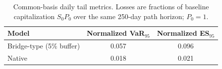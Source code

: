 \begin{table}[t]
\centering
\footnotesize
\caption{Common-basis daily tail metrics. Losses are fractions of baseline capitalization $S_0P_0$ over the same 250-day path horizon; $P_0=1$.}
\label{tab:summary_metrics}
\begin{tabular}{l c c}
\hline
Model & Normalized VaR$_{95}$ & Normalized ES$_{95}$ \\
\hline
Bridge-type (5\% buffer) & 0.057 & 0.096 \\
Native & 0.018 & 0.021 \\
\hline
\end{tabular}
\end{table}
